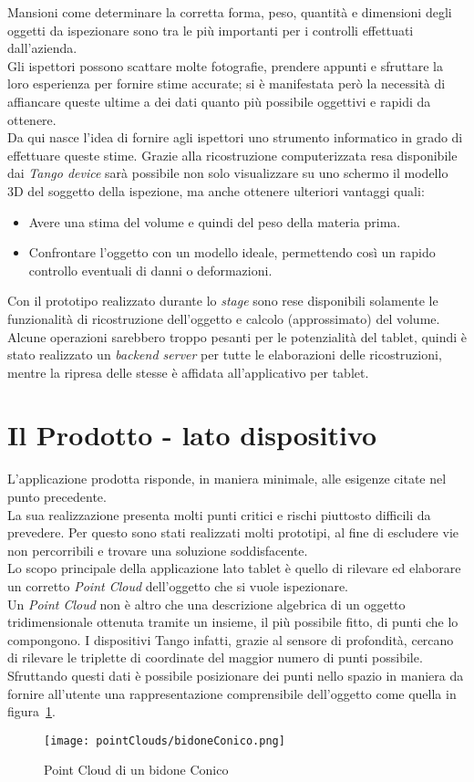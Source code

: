 Mansioni come determinare la corretta forma, peso, quantità e dimensioni degli oggetti da ispezionare sono tra le più importanti per i controlli effettuati dall'azienda.\\
Gli ispettori possono scattare molte fotografie, prendere appunti e sfruttare la loro esperienza per fornire stime accurate; si è manifestata però la necessità di affiancare queste ultime a dei dati quanto più possibile oggettivi e rapidi da ottenere.\\
Da qui nasce l'idea di fornire agli ispettori uno strumento informatico in grado di effettuare queste stime. Grazie alla ricostruzione computerizzata resa disponibile dai \emph{Tango device} sarà possibile non solo visualizzare su uno schermo il modello 3D del soggetto della ispezione, ma anche ottenere ulteriori vantaggi quali:
\begin{itemize}
	\item Avere una stima del volume e quindi del peso della materia prima.
	\item Confrontare l'oggetto con un modello ideale, permettendo così un rapido controllo eventuali di danni o deformazioni.
\end{itemize}
Con il prototipo realizzato durante lo \emph{stage} sono rese disponibili solamente le funzionalità di ricostruzione dell'oggetto e calcolo (approssimato) del volume.\\
Alcune operazioni sarebbero troppo pesanti per le potenzialità del tablet, quindi è stato realizzato un \emph{backend server} per tutte le elaborazioni delle ricostruzioni, mentre la ripresa delle stesse è affidata all'applicativo per tablet.

\section{Il Prodotto - lato dispositivo}
L'applicazione prodotta risponde, in maniera minimale, alle esigenze citate nel punto precedente.\\
La sua realizzazione presenta molti punti critici e rischi piuttosto difficili da prevedere. Per questo sono stati realizzati molti prototipi, al fine di escludere vie non percorribili e trovare una soluzione soddisfacente.\\
Lo scopo principale della applicazione lato tablet è quello di rilevare ed elaborare un corretto \emph{Point Cloud} dell'oggetto che si vuole ispezionare.\\
Un \emph{Point Cloud} non è altro che una descrizione algebrica di un oggetto tridimensionale ottenuta tramite un insieme, il più possibile fitto, di punti che lo compongono. I dispositivi Tango infatti, grazie al sensore di profondità, cercano di rilevare le triplette di coordinate del maggior numero di punti possibile. Sfruttando questi dati è possibile posizionare dei punti nello spazio in maniera da fornire all'utente una rappresentazione comprensibile dell'oggetto come quella in figura~\ref{figure:bidone_conico}.
\begin{figure}[H] 
    \centering 
    \texttt{[image: pointClouds/bidoneConico.png]}
    \caption{Point Cloud di un bidone Conico}
    \label{figure:bidone_conico} 
\end{figure}


